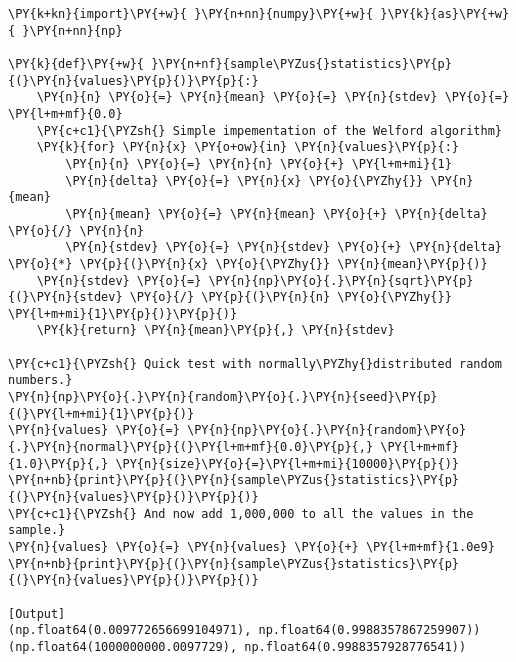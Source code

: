 \begin{Verbatim}[label=\makebox{\href{https://github.com/unipi-physics-labs/statnotes/tree/main/snippy/sample_stat3.py}{https://github.com/.../sample\_stat3.py}},commandchars=\\\{\}]
\PY{k+kn}{import}\PY{+w}{ }\PY{n+nn}{numpy}\PY{+w}{ }\PY{k}{as}\PY{+w}{ }\PY{n+nn}{np}

\PY{k}{def}\PY{+w}{ }\PY{n+nf}{sample\PYZus{}statistics}\PY{p}{(}\PY{n}{values}\PY{p}{)}\PY{p}{:}
    \PY{n}{n} \PY{o}{=} \PY{n}{mean} \PY{o}{=} \PY{n}{stdev} \PY{o}{=} \PY{l+m+mf}{0.0}
    \PY{c+c1}{\PYZsh{} Simple impementation of the Welford algorithm}
    \PY{k}{for} \PY{n}{x} \PY{o+ow}{in} \PY{n}{values}\PY{p}{:}
        \PY{n}{n} \PY{o}{=} \PY{n}{n} \PY{o}{+} \PY{l+m+mi}{1}
        \PY{n}{delta} \PY{o}{=} \PY{n}{x} \PY{o}{\PYZhy{}} \PY{n}{mean}
        \PY{n}{mean} \PY{o}{=} \PY{n}{mean} \PY{o}{+} \PY{n}{delta} \PY{o}{/} \PY{n}{n}
        \PY{n}{stdev} \PY{o}{=} \PY{n}{stdev} \PY{o}{+} \PY{n}{delta} \PY{o}{*} \PY{p}{(}\PY{n}{x} \PY{o}{\PYZhy{}} \PY{n}{mean}\PY{p}{)}
    \PY{n}{stdev} \PY{o}{=} \PY{n}{np}\PY{o}{.}\PY{n}{sqrt}\PY{p}{(}\PY{n}{stdev} \PY{o}{/} \PY{p}{(}\PY{n}{n} \PY{o}{\PYZhy{}} \PY{l+m+mi}{1}\PY{p}{)}\PY{p}{)}
    \PY{k}{return} \PY{n}{mean}\PY{p}{,} \PY{n}{stdev}

\PY{c+c1}{\PYZsh{} Quick test with normally\PYZhy{}distributed random numbers.}
\PY{n}{np}\PY{o}{.}\PY{n}{random}\PY{o}{.}\PY{n}{seed}\PY{p}{(}\PY{l+m+mi}{1}\PY{p}{)}
\PY{n}{values} \PY{o}{=} \PY{n}{np}\PY{o}{.}\PY{n}{random}\PY{o}{.}\PY{n}{normal}\PY{p}{(}\PY{l+m+mf}{0.0}\PY{p}{,} \PY{l+m+mf}{1.0}\PY{p}{,} \PY{n}{size}\PY{o}{=}\PY{l+m+mi}{10000}\PY{p}{)}
\PY{n+nb}{print}\PY{p}{(}\PY{n}{sample\PYZus{}statistics}\PY{p}{(}\PY{n}{values}\PY{p}{)}\PY{p}{)}
\PY{c+c1}{\PYZsh{} And now add 1,000,000 to all the values in the sample.}
\PY{n}{values} \PY{o}{=} \PY{n}{values} \PY{o}{+} \PY{l+m+mf}{1.0e9}
\PY{n+nb}{print}\PY{p}{(}\PY{n}{sample\PYZus{}statistics}\PY{p}{(}\PY{n}{values}\PY{p}{)}\PY{p}{)}

[Output]
(np.float64(0.009772656699104971), np.float64(0.9988357867259907))
(np.float64(1000000000.0097729), np.float64(0.9988357928776541))
\end{Verbatim}
